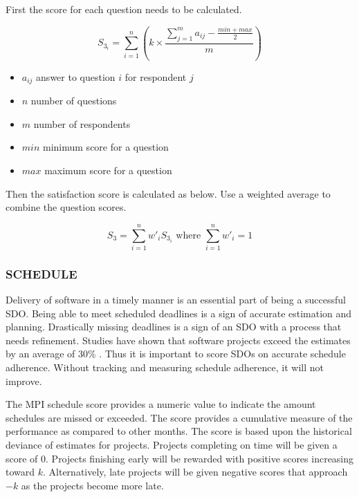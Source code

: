 \documentclass[SDSUThesis.tex]{subfiles}
\begin{document}
                First the score for each question needs to be calculated.
                
                \[
                    S_{3_i} = \sum^n_{i=1}\left( k \times \frac{ \sum^m_{j=1}a_{ij}-\frac{min + max}{2}}{m} \right)
                \]
                
                \begin{itemize}
                    \item $a_{ij}$ answer to question $i$ for respondent $j$
                    \item $n$ number of questions
                    \item $m$ number of respondents
                    \item $min$ minimum score for a question
                    \item $max$ maximum score for a question
                \end{itemize}
                
                Then the satisfaction score is calculated as below.  Use a weighted average
                to combine the question scores.
                
                \[
                    S_{3} = \sum\limits^n_{i=1} w'_i S_{3_i} \text{ where } \sum\limits^n_{i=1} w'_i = 1
                \]

        \subsubsection{SCHEDULE}  
            Delivery of software in a timely manner is an essential part of being a 
            successful SDO.  Being able to meet scheduled deadlines is a sign of accurate
            estimation and planning.  Drastically missing deadlines is a sign of an SDO
            with a process that needs refinement.  Studies have shown that 
            software projects exceed the estimates by an average of
            30\% \cite{Jorgensen2014}.  Thus it is important to score SDOs on accurate
            schedule adherence. Without tracking and measuring schedule adherence, it will
            not improve.  
            
            The MPI schedule score provides a numeric value to indicate the amount 
            schedules are missed or exceeded.  The score provides a cumulative measure
            of the performance as compared to other months.
            The score is based upon the historical deviance of estimates for
            projects.  Projects completing on time will be given a score of 0.
            Projects finishing early will be rewarded with positive scores increasing toward
            $k$. Alternatively, 
            late projects will be given negative scores that approach $-k$ as the projects
            become more late. 
            
\end{document}
